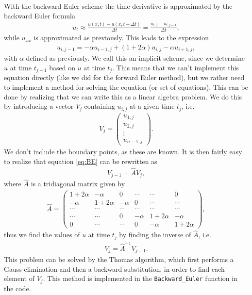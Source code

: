 \documentclass[12pt, a4paper]{article}
\begin{document}
With the backward Euler scheme the time derivative is approximated by the backward Euler formula  
\begin{align*}
u_t \approx \frac{u(x,t) - u(x,t-\Delta t)}{\Delta t} = \frac{u_{i,j}- u_{i,j-1}}{\Delta t}, 
\end{align*}
while $u_{xx}$ is approximated as previously. This leads to the expression 
\begin{align}
u_{i,j-1} = -\alpha u_{i-1,j} + (1+2\alpha) u_{i,j} - \alpha u_{i+1,j},    
\label{eq:BE}
\end{align}  
with $\alpha$ defined as previously. 
We call this an implicit scheme, since we determine $u$ at time $t_{j-1}$ based on $u$ at time $t_j$. 
This means that we can't implement this equation directly (like we did for the forward Euler method), but 
we rather need to implement a method for solving the equation (or set of equations). This can be done 
by realizing that we can write this as a linear algebra problem. We do this by introducing a vector 
$V_j$ containing $u_{i,j}$ at a given time $t_j$, i.e. 
\begin{align*}
V_j = \left( \begin{array}{c}
u_{1,j} \\ u_{2,j} \\ \vdots \\ u_{n-1,j}
\end{array} \right). 
\end{align*}
We don't include the boundary points, as these are known. It is then fairly easy to realize that 
equation \ref{eq:BE} can be rewritten as 
\begin{align*}
V_{j-1} = \hat{A} V_j, 
\end{align*}
where $\hat{A}$ is a tridiagonal matrix given by 
\begin{align*}
\hat{A} = \left( \begin{array}{cccccc}
1+2\alpha & -\alpha & 0 & \cdots & \cdots & 0 \\ 
-\alpha & 1+2\alpha & -\alpha & 0 & \cdots & \cdots \\
\cdots & \cdots & \cdots & \cdots & \cdots & \cdots \\ 
\cdots & \cdots & 0 & -\alpha & 1+2\alpha & -\alpha \\
0 & \cdots &  \cdots & 0 & -\alpha & 1+2\alpha 
\end{array} \right),  
\end{align*}
thus we find the values of $u$ at time $t_j$ by finding the inverse of $\hat{A}$, i.e. 
\begin{align*}
V_j = \hat{A}^{-1} V_{j-1}. 
\end{align*}
This problem can be solved by the Thomas algorithm, which first performs a Gauss elimination and then a 
backward substitution, in order to find each element of $V_j$. This method is implemented in the 
\texttt{Backward\_Euler} function in the code.   
\end{document}
